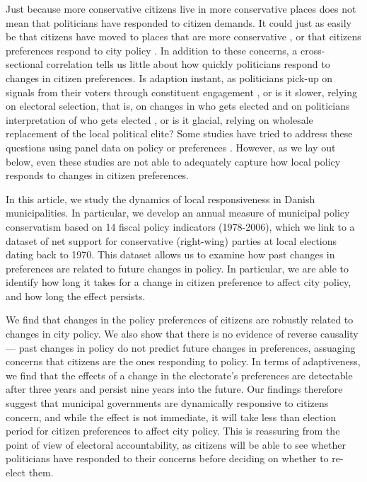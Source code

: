 \documentclass[a4paper,12pt]{article}
\begin{document}
Just because more conservative citizens live in more conservative places does not mean that politicians have responded to citizen demands. It could just as easily be that citizens have moved to places that are more conservative \citep{tiebout1956pure}, or that citizens preferences respond to city policy \citep{slothuus2010can,broockman2017causal}. In addition to these concerns, a cross-sectional correlation tells us little about how quickly politicians respond to changes in citizen preferences. Is adaption instant, as politicians pick-up on signals from their voters through constituent engagement \citep{butler2011can}, or is it slower, relying on electoral selection, that is, on changes in who gets elected and on politicians interpretation of who gets elected \citep{mansbridge2009selection}, or is it glacial, relying on wholesale replacement of the local political elite? Some studies have tried to address these questions using panel data on policy or preferences \citep[see][]{einstein2016pushing,sances2017voters}. However, as we lay out below, even these studies are not able to adequately capture how local policy responds to changes in citizen preferences. 

In this article, we study the dynamics of local responsiveness in Danish municipalities. In particular, we develop an annual measure of municipal policy conservatism based on 14 fiscal policy indicators (1978-2006), which we link to a dataset of net support for conservative (right-wing) parties at local elections dating back to 1970.  This dataset allows us to examine how past changes in preferences are related to future changes in policy. In particular, we are able to identify how long it takes for a change in citizen preference to affect city policy, and how long the effect persists.

We find that changes in the policy preferences of citizens are robustly related to changes in city policy. We also show that there is no evidence of reverse causality--- past changes in policy do not predict future changes in preferences, assuaging concerns that citizens are the ones responding to policy. In terms of adaptiveness, we find that the effects of a change in the electorate's preferences are detectable after three years and persist nine years into the future. Our findings therefore suggest that municipal governments are dynamically responsive to citizens concern, and while the effect is not immediate, it will take less than election period for citizen preferences to affect city policy. This is reassuring from the point of view of electoral accountability, as citizens will be able to see whether politicians have responded to their concerns before deciding on whether to re-elect them.
\end{document}
